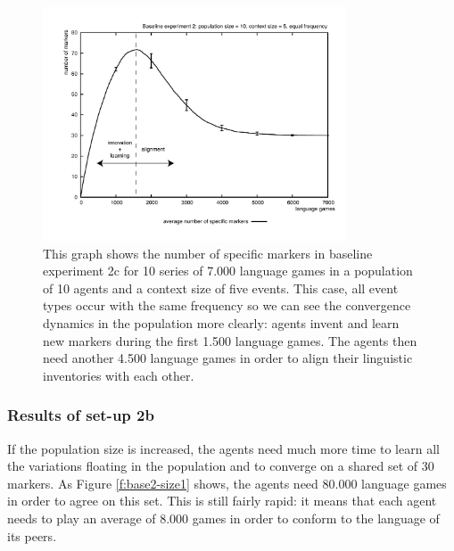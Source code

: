\begin{figure}[ht]
\centerline{\includegraphics[width=0.8\textwidth]{Chapter3/figs/graph-base2-size2}}
  \caption[Baseline experiment 2c: number of markers (equal frequency)]{This graph shows the number of specific markers in baseline experiment 2c for 10 series of 7.000 language games in a population of 10 agents and a context size of five events. This case, all event types occur with the same frequency so we can see the convergence dynamics in the population more clearly: agents invent and learn new markers during the first 1.500 language games. The agents then need another 4.500 language games in order to align their linguistic inventories with each other.}
   \label{f:base2-size2}
\end{figure}
\subsubsection{Results of set-up 2b}
 If the population size is increased, the agents need much more time to learn all the variations floating in the population and to converge on a shared set of 30 markers. As Figure \ref{f:base2-size1} shows, the agents need 80.000 language games in order to agree on this set. This is still fairly rapid: it means that each agent needs to play an average of 8.000 games in order to conform to the language of its peers.

